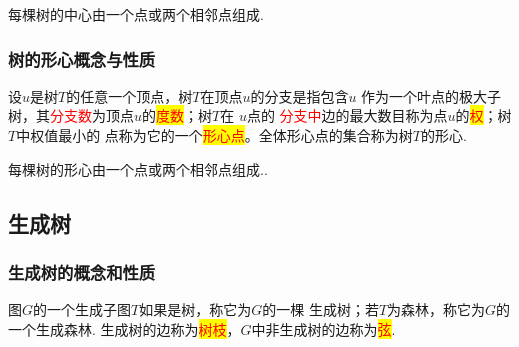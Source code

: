 \begin{theorem}
	每棵树的中心由一个点或两个相邻点组成.
\end{theorem}
	
	
	
	


\subsubsection{树的形心概念与性质}

\begin{definition}
	设$u$是树$T$的任意一个顶点，树$T$在顶点$u$的分支是指包含$u$
	作为一个叶点的极大子树，其\textcolor{red}{分支数}为顶点$u$的\colorbox{yellow}{\textcolor{red}{度数}}；树$T$在
	$u$点的\textcolor{red}{ 分支中}边的最大数目称为点$u$的\colorbox{yellow}{\textcolor{red}{权}}；树$T$中权值最小的
	点称为它的一个\colorbox{yellow}{\textcolor{red}{形心点}}。全体形心点的集合称为树$T$的形心.
\end{definition}
\begin{theorem}
	每棵树的形心由一个点或两个相邻点组成..
\end{theorem}

\subsection{生成树}
\subsubsection{生成树的概念和性质}

\begin{definition}
	图$G$的一个生成子图$T$如果是树，称它为$G$的一棵
	生成树；若$T$为森林，称它为$G$的一个生成森林.
	生成树的边称为\colorbox{yellow}{\textcolor{red}{树枝}}，$G$中非生成树的边称为\colorbox{yellow}{\textcolor{red}{弦}}.
\end{definition}

